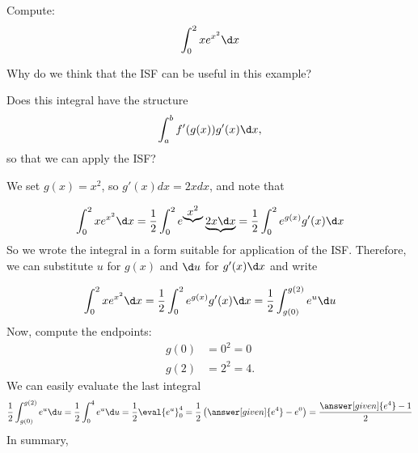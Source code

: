 \documentclass{ximera}
\begin{document}
\begin{example}
Compute:
\[
\int_0^2 x e^{x^2}\d x
\]
\begin{explanation}
Why do we think that the ISF can be useful in this example?

Does this integral have the structure
\[
\int_a^b f'(g(x)) g'(x) \d x ,  
\]
so that we can apply the ISF?

We set $g(x) =x^2$, so $g'(x)dx =2xdx$, and note that

\[
\int_0^2 x e^{x^2}\d x
=\frac{1}{2}\int_0^{2} e^{\underbrace{x^2}}\underbrace{2x\d x}=\frac{1}{2}\int_0^{2} e^{g(x)}g'(x)\d x
\]
So we wrote the integral in a form suitable for application of the ISF. Therefore, we can substitute $u$ for $g(x)$ and $\d u$ for $g'(x)\d x$ and write

\[
\int_0^2 x e^{x^2}\d x=\frac{1}{2}\int_0^{2} e^{g(x)}g'(x)\d x=\frac{1}{2}\int_{g(0)}^{g(2)} e^{u}\d u
\]
Now, compute the endpoints: 
\begin{align*}
g(0) &= 0^2 = 0  \\
g(2) &=2^2 = 4.
\end{align*}
We can easily evaluate the last integral
\[
\frac{1}{2}\int_{g(0)}^{g(2)} e^{u}\d u=
\frac{1}{2}\int_{0}^{4} e^{u}\d u=\frac{1}{2}\eval{e^u}_0^4=\frac{1}{2}\left(\answer[given]{e^4}-e^0\right)=\frac{\answer[given]{e^4}-1}{2}
\]
In summary,


\end{explanation}
\end{example}
\end{document}
